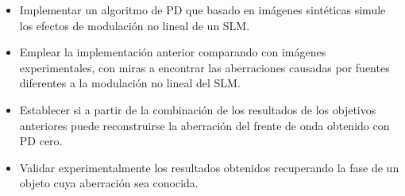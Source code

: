 \begin{itemize}


\item Implementar un algoritmo de PD que basado en imágenes sintéticas simule los efectos de modulación no lineal de un SLM. 


\item Emplear la implementación anterior comparando con imágenes experimentales, con miras a encontrar las aberraciones causadas por fuentes diferentes a la modulación no lineal del SLM.


\item Establecer si a partir de la combinación de los resultados de los objetivos anteriores puede reconstruirse la aberración del frente de onda obtenido con PD cero. %



\item Validar experimentalmente los resultados obtenidos recuperando la fase de un objeto cuya aberración sea conocida.
\end{itemize}